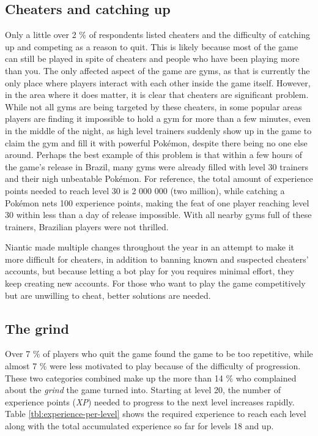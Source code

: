 \subsection{Cheaters and catching up}
\label{sec:cheaters-analysis}
Only a little over 2 \% of respondents listed cheaters and the difficulty of catching up and competing as a reason to quit. This is likely because most of the game can still be played in spite of cheaters and people who have been playing more than you. The only affected aspect of the game are gyms, as that is currently the only place where players interact with each other inside the game itself. However, in the area where it does matter, it is clear that cheaters are significant problem. While not all gyms are being targeted by these cheaters, in some popular areas players are finding it impossible to hold a gym for more than a few minutes, even in the middle of the night, as high level trainers suddenly show up in the game to claim the gym and fill it with powerful Pokémon, despite there being no one else around. Perhaps the best example of this problem is that within a few hours of the game's release in Brazil, many gyms were already filled with level 30 trainers and their nigh unbeatable Pokémon. For reference, the total amount of experience points needed to reach level 30 is 2 000 000 (two million), while catching a Pokémon nets 100 experience points, making the feat of one player reaching level 30 within less than a day of release impossible.  With all nearby gyms full of these trainers, Brazilian players were not thrilled.

Niantic made multiple changes throughout the year in an attempt to make it more difficult for cheaters, in addition to banning known and suspected cheaters' accounts, but because letting a bot play for you requires minimal effort, they keep creating new accounts. For those who want to play the game competitively but are unwilling to cheat, better solutions are needed. 

\subsection{The grind}
Over 7 \% of players who quit the game found the game to be too repetitive, while almost 7 \% were less motivated to play because of the difficulty of progression. These two categories combined make up the more than 14 \% who complained about the \emph{grind}  the game turned into. Starting at level 20, the number of experience points (\emph{XP}) needed to progress to the next level increases rapidly. Table \ref{tbl:experience-per-level} shows the required experience to reach each level along with the total accumulated experience so far for levels 18 and up. 

